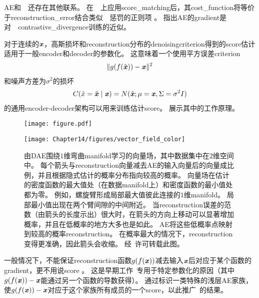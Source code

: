 \gls{AE}和~~还存在其他联系。
在~~上应用\gls{score_matching}后，其\gls{cost_function}将等价于\gls{reconstruction_error}结合类似~~惩罚的正则项 \citep{Swersky-ICML2011}。
\citet{Bengio+Delalleau-2009}指出\gls{AE}的\gls{gradient}是对~~\gls{contrastive_divergence}训练的近似。


对于连续的$\boldsymbol{\mathit{x}}$，高斯损坏和\gls{reconstruction}分布的\gls{denoising}\gls{criterion}得到的\gls{score}估计适用于一般\gls{encoder}和\gls{decoder}的参数化\citep{Alain+Bengio-ICLR2013-small}。
这意味着一个使用平方误差\gls{criterion}
\begin{align}
 \| g(f(\tilde {\boldsymbol{\mathit{x}}})) - \boldsymbol{\mathit{x}} \|^2
\end{align}
和噪声方差为$\sigma^2 $的损坏
\begin{align}
 C(\tilde x = \tilde {\boldsymbol{\mathit{x}}} \mid \boldsymbol{\mathit{x}}) = N(\tilde {\boldsymbol{\mathit{x}}}; \mu=\boldsymbol{\mathit{x}}, \Sigma = \sigma^2 I)
\end{align}
的通用\gls{encoder}-\gls{decoder}架构可以用来训练估计\gls{score}。
展示其中的工作原理。

\begin{figure}[!htb]
\ifOpenSource
\centerline{\texttt{[image: figure.pdf]}}
\else
\centerline{\texttt{[image: Chapter14/figures/vector\_field\_color]}}
\fi
\caption{由\gls{DAE}围绕$1$维弯曲\gls{manifold}学习的向量场，其中数据集中在$2$维空间中。
每个箭头与\gls{reconstruction}向量减去\gls{AE}的输入向量后的向量成比例，并且根据隐式估计的概率分布指向较高的概率。
向量场在估计的密度函数的最大值处（在数据\gls{manifold}上）和密度函数的最小值处都为零。
例如，螺旋臂形成局部最大值彼此连接的$1$维\gls{manifold}。
局部最小值出现在两个臂间隙的中间附近。
当\gls{reconstruction}误差的范数（由箭头的长度示出）很大时，在箭头的方向上移动可以显著增加概率，并且在低概率的地方大多也是如此。
\gls{AE}将这些低概率点映射到较高的概率\gls{reconstruction}。
在概率最大的情况下，\gls{reconstruction}变得更准确，因此箭头会收缩。
经~\citet{Alain+Bengio-ICLR2013-small}许可转载此图。
}
\label{fig:chap14_vector_field_color}
\end{figure}

一般情况下，不能保证\gls{reconstruction}函数$g(f(\boldsymbol{\mathit{x}}))$减去输入$\boldsymbol{\mathit{x}}$后对应于某个函数的\gls{gradient}，更不用说\gls{score} 。
这是早期工作~\citep{Vincent-NC-2011-small}专用于特定参数化的原因（其中$g(f(\boldsymbol{\mathit{x}})) - \boldsymbol{\mathit{x}}$能通过另一个函数的导数获得）。
\citet{Kamyshanska+Memisevic-2015}通过标识一类特殊的浅层\gls{AE}家族，使$g(f(\boldsymbol{\mathit{x}})) - \boldsymbol{\mathit{x}}$对应于这个家族所有成员的一个\gls{score}，以此推广~\citet{Vincent-NC-2011-small}的结果。

